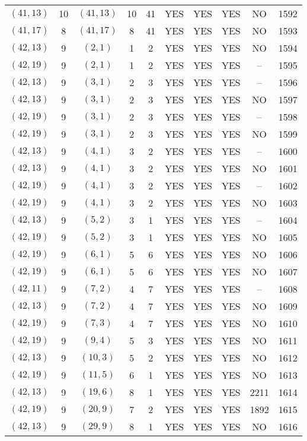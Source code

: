 \begin{longtable}{|c|c|c|c|c|c|c|c|c|c|}
$(41, 13)$ & 10 & $(41, 13)$ & 10 & 41 & YES & YES & YES & NO & 1592\\
$(41, 17)$ & 8 & $(41, 17)$ & 8 & 41 & YES & YES & YES & NO & 1593\\
$(42, 13)$ & 9 & $(2, 1)$ & 1 & 2 & YES & YES & YES & NO & 1594\\
$(42, 19)$ & 9 & $(2, 1)$ & 1 & 2 & YES & YES & YES & -- & 1595\\
$(42, 13)$ & 9 & $(3, 1)$ & 2 & 3 & YES & YES & YES & -- & 1596\\
$(42, 13)$ & 9 & $(3, 1)$ & 2 & 3 & YES & YES & YES & NO & 1597\\
$(42, 19)$ & 9 & $(3, 1)$ & 2 & 3 & YES & YES & YES & -- & 1598\\
$(42, 19)$ & 9 & $(3, 1)$ & 2 & 3 & YES & YES & YES & NO & 1599\\
$(42, 13)$ & 9 & $(4, 1)$ & 3 & 2 & YES & YES & YES & -- & 1600\\
$(42, 13)$ & 9 & $(4, 1)$ & 3 & 2 & YES & YES & YES & NO & 1601\\
$(42, 19)$ & 9 & $(4, 1)$ & 3 & 2 & YES & YES & YES & -- & 1602\\
$(42, 19)$ & 9 & $(4, 1)$ & 3 & 2 & YES & YES & YES & NO & 1603\\
$(42, 13)$ & 9 & $(5, 2)$ & 3 & 1 & YES & YES & YES & -- & 1604\\
$(42, 19)$ & 9 & $(5, 2)$ & 3 & 1 & YES & YES & YES & NO & 1605\\
$(42, 19)$ & 9 & $(6, 1)$ & 5 & 6 & YES & YES & YES & NO & 1606\\
$(42, 19)$ & 9 & $(6, 1)$ & 5 & 6 & YES & YES & YES & NO & 1607\\
$(42, 11)$ & 9 & $(7, 2)$ & 4 & 7 & YES & YES & YES & -- & 1608\\
$(42, 13)$ & 9 & $(7, 2)$ & 4 & 7 & YES & YES & YES & NO & 1609\\
$(42, 19)$ & 9 & $(7, 3)$ & 4 & 7 & YES & YES & YES & NO & 1610\\
$(42, 19)$ & 9 & $(9, 4)$ & 5 & 3 & YES & YES & YES & NO & 1611\\
$(42, 13)$ & 9 & $(10, 3)$ & 5 & 2 & YES & YES & YES & NO & 1612\\
$(42, 19)$ & 9 & $(11, 5)$ & 6 & 1 & YES & YES & YES & NO & 1613\\
$(42, 13)$ & 9 & $(19, 6)$ & 8 & 1 & YES & YES & YES & 2211 & 1614\\
$(42, 19)$ & 9 & $(20, 9)$ & 7 & 2 & YES & YES & YES & 1892 & 1615\\
$(42, 13)$ & 9 & $(29, 9)$ & 8 & 1 & YES & YES & YES & NO & 1616\\

\end{longtable}
